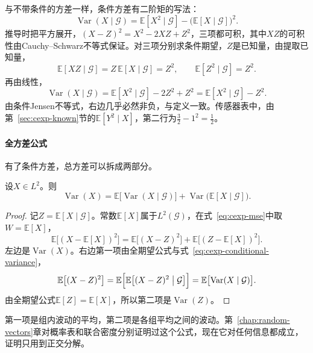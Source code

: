 与不带条件的方差一样，条件方差有二阶矩的写法：
\begin{equation}
 \operatorname{Var}(X\mid\mathcal{G})=\mathbb{E}[X^{2}\mid\mathcal{G}]-\bigl(\mathbb{E}[X\mid\mathcal{G}]\bigr)^{2}.
 \label{eq:cexp-conditional-variance-moment}
\end{equation}
推导时把平方展开，$(X-Z)^{2}=X^{2}-2XZ+Z^{2}$，三项都可积，其中$XZ$的可积性由Cauchy--Schwarz不等式保证。对三项分别求条件期望，$Z$是已知量，由提取已知量，
\[
 \mathbb{E}[XZ\mid\mathcal{G}]=Z\,\mathbb{E}[X\mid\mathcal{G}]=Z^{2},\qquad \mathbb{E}[Z^{2}\mid\mathcal{G}]=Z^{2}.
\]
再由线性，
\[
 \operatorname{Var}(X\mid\mathcal{G})=\mathbb{E}[X^{2}\mid\mathcal{G}]-2Z^{2}+Z^{2}=\mathbb{E}[X^{2}\mid\mathcal{G}]-Z^{2}.
\]
由条件Jensen不等式，右边几乎必然非负，与定义一致。传感器表中，由第~\ref{sec:cexp-known}节的$\mathbb{E}[Y^{2}\mid X]$，第二行为$\tfrac32-1^{2}=\tfrac12$。

\paragraph{全方差公式}
有了条件方差，总方差可以拆成两部分。

\begin{theorem}[全方差公式]
\label{thm:cexp-total-variance}
设$X\in L^{2}$。则
\begin{equation}
 \operatorname{Var}(X)=\mathbb{E}\bigl[\operatorname{Var}(X\mid\mathcal{G})\bigr]+\operatorname{Var}\bigl(\mathbb{E}[X\mid\mathcal{G}]\bigr).
 \label{eq:cexp-total-variance}
\end{equation}
\end{theorem}

\begin{proof}
记$Z=\mathbb{E}[X\mid\mathcal{G}]$。常数$\mathbb{E}[X]$属于$L^{2}(\mathcal{G})$，在式~\eqref{eq:cexp-mse}中取$W=\mathbb{E}[X]$，
\[
 \mathbb{E}\bigl[(X-\mathbb{E}[X])^{2}\bigr]=\mathbb{E}\bigl[(X-Z)^{2}\bigr]+\mathbb{E}\bigl[(Z-\mathbb{E}[X])^{2}\bigr].
\]
左边是$\operatorname{Var}(X)$。右边第一项由全期望公式与式~\eqref{eq:cexp-conditional-variance}，
\[
 \mathbb{E}\bigl[(X-Z)^{2}\bigr]=\mathbb{E}\Bigl[\mathbb{E}\bigl[(X-Z)^{2}\bigm|\mathcal{G}\bigr]\Bigr]=\mathbb{E}\bigl[\operatorname{Var}(X\mid\mathcal{G})\bigr].
\]
由全期望公式$\mathbb{E}[Z]=\mathbb{E}[X]$，所以第二项是$\operatorname{Var}(Z)$。
\end{proof}

第一项是组内波动的平均，第二项是各组平均之间的波动。第~\ref{chap:random-vectors}章对概率表和联合密度分别证明过这个公式，现在它对任何信息都成立，证明只用到正交分解。

